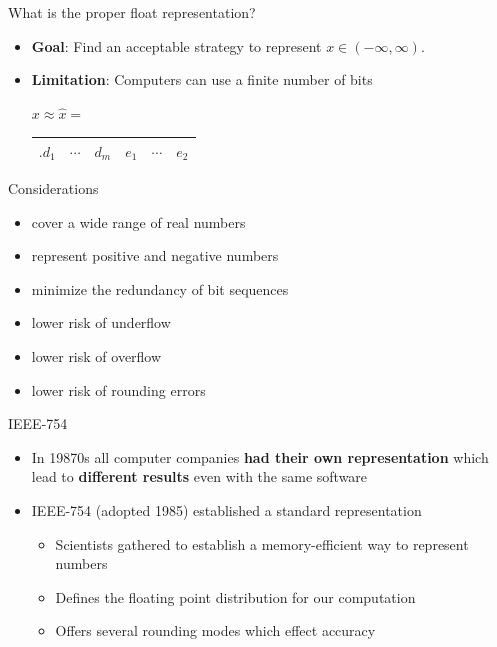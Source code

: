 \documentclass[10pt]{beamer}
\begin{document}
\begin{frame}{What is the proper float representation?}
\begin{itemize}
    \item \textbf{Goal}: Find an acceptable strategy to represent $x \in (-\infty,\infty).$
    \item \textbf{Limitation}: Computers can use a finite number of bits
    \begin{center}$x\approx \hat{x}=$
    \begin{tabular}{|c|c|c||c|c| c|}\hline
      $.d_1$ & $\cdots$ & $d_m$ & $e_1$ & $\cdots$&$e_2$\\\hline
    \end{tabular}
    \end{center}
\end{itemize}

\begin{block}{Considerations}
    \begin{itemize}
        \item cover a wide range of real numbers
        \item represent positive and negative numbers 
        \item minimize the redundancy of bit sequences 
        \item lower risk of underflow 
        \item lower risk of overflow 
        \item lower risk of rounding errors
    \end{itemize}
\end{block}
\end{frame}
\begin{frame}{IEEE-754}
\begin{itemize} 
\item In 19870s all computer companies \textbf{had their own representation} which lead to \textbf{different results} even with the same software

\bigskip

  \item IEEE-754 (adopted 1985) established a standard representation
    \begin{itemize}
       \item Scientists gathered to establish a memory-efficient way to represent numbers
      \item Defines the floating point distribution for our computation
      \item Offers several rounding modes which effect accuracy
    \end{itemize}
    \bigskip

\end{itemize}
\end{frame}
\end{document}
